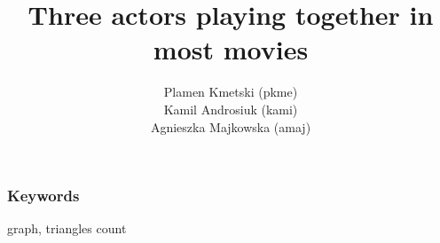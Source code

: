 \documentclass[11pt]{article} %
\title{Three actors playing together in most movies}
\author{Plamen Kmetski (pkme)\\Kamil Androsiuk (kami)\\Agnieszka Majkowska (amaj)}
\begin{document}
\maketitle


\subsubsection*{Keywords}
graph, triangles count








\end{document}
